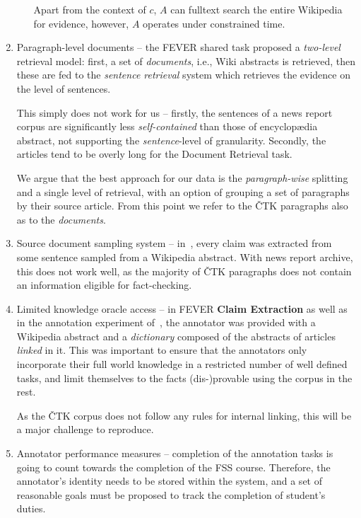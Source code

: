 \begin{enumerate}
\begin{enumerate}
        Apart from the context of $c$, $A$ can fulltext search the entire \textsf{Wikipedia} for evidence, however, $A$ operates under constrained time.
    \end{enumerate}
    
    \item {\techbf Paragraph-level documents} -- the \textsf{FEVER} shared task proposed a \textit{two-level} retrieval model: first, a set of \textit{documents}, i.e., \textsf{Wiki} abstracts is retrieved, then these are fed to the \textit{sentence retrieval} system which retrieves the evidence on the level of sentences.
    
    This simply does not work for us -- firstly, the sentences of a news report corpus are significantly less \textit{self-contained} than those of encyclop\ae{}dia abstract, not supporting the \textit{sentence}-level of granularity. Secondly, the articles tend to be overly long for the Document Retrieval task. 
    
    We argue that the best approach for our data is the \textit{paragraph-wise} splitting and a single level of retrieval, with an option of grouping a set of paragraphs by their source article. From this point we refer to the \textsf{ČTK} paragraphs also as to the \textit{documents}.
    
    \item {\techbf Source document sampling system} -- in~\cite{fever}, every claim was extracted from some sentence sampled from a \textsf{Wikipedia} abstract. With news report archive, this does not work well, as the majority of \textsf{ČTK} paragraphs does not contain an information eligible for fact-checking.
    \item {\techbf Limited knowledge oracle access} -- in \textsf{FEVER} \textbf{Claim Extraction} as well as in the annotation experiment of~\cite{danish}, the annotator was provided with a \textsf{Wikipedia} abstract and a \textit{dictionary} composed of the abstracts of articles \textit{linked} in it. This was important to ensure that the annotators only incorporate their full world knowledge in a restricted number of well defined tasks, and limit themselves to the facts (dis-)provable using the corpus in the rest.
    
    As the \textsf{ČTK} corpus does not follow any rules for internal linking, this will be a major challenge to reproduce. 
    \item {\techbf Annotator performance measures} -- completion of the annotation tasks is going to count towards the completion of the \textsf{FSS} course. Therefore, the annotator's identity needs to be stored within the system, and a set of reasonable goals must be proposed to track the completion of student's duties. 
    

\end{enumerate}
